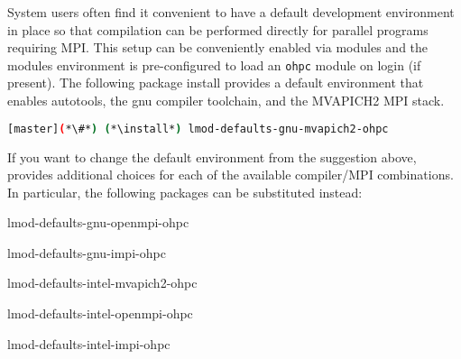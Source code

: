 System users often find it convenient to have a default development environment
in place so that compilation can be performed directly for parallel programs
requiring MPI. This setup can be conveniently enabled via modules and the \OHPC{}
modules environment is pre-configured to load an \texttt{ohpc} module on login
(if present).  The following package install provides a default
environment that enables autotools, the gnu compiler toolchain, and the
MVAPICH2 MPI stack.

\begin{lstlisting}[language=bash]
[master](*\#*) (*\install*) lmod-defaults-gnu-mvapich2-ohpc
\end{lstlisting}

\begin{center}
\begin{tcolorbox}[]
\small
If you want to change the default environment from the suggestion above, \OHPC{}
provides additional choices for each of the available compiler/MPI
combinations. In particular, the following packages can be substituted instead:
\begin{multicols}{2}
\begin{itemize*}
\item lmod-defaults-gnu-openmpi-ohpc
\item lmod-defaults-gnu-impi-ohpc
\item lmod-defaults-intel-mvapich2-ohpc
\item lmod-defaults-intel-openmpi-ohpc
\item lmod-defaults-intel-impi-ohpc
\end{itemize*}
\end{multicols}
\end{tcolorbox}
\end{center}
